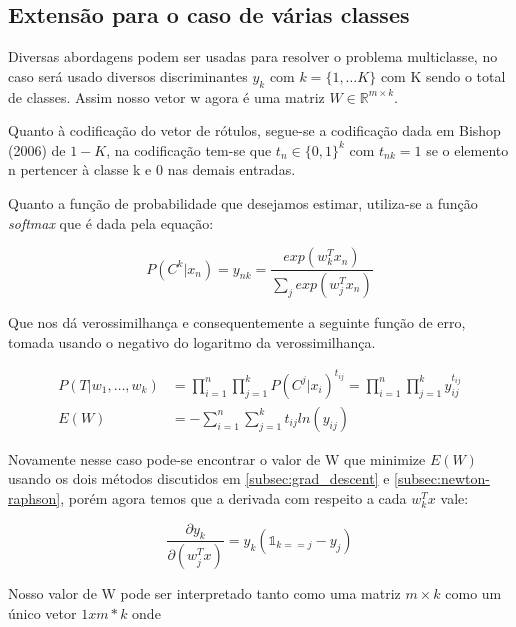 \subsection{Extensão para o caso de várias classes}

Diversas abordagens podem ser usadas para resolver o problema multiclasse, no
caso será usado diversos discriminantes $y_k$ com $k = \{1, \ldots K\}$ com K
sendo o total de classes. Assim nosso vetor w agora é uma matriz
$W \in \mathbb{R}^{m \times k}$. 

Quanto à codificação do vetor de rótulos, 
segue-se a codificação dada em Bishop (2006)\cite{Bishop2006} de $1-K$,
na codificação tem-se que $t_n \in \{0, 1\}^k$ com $t_{nk} = 1$ se o elemento
n pertencer à classe k e 0 nas demais entradas. 

Quanto a função de probabilidade que desejamos estimar, utiliza-se a função
\textit{softmax} que é dada pela equação:

\begin{center}
	\begin{equation}
		P(C^k | x_n) = y_{nk} = \frac{exp(w_k^Tx_n)}{\sum_j exp(w_j^Tx_n)} 
	\end{equation}
\end{center}

Que nos dá verossimilhança e consequentemente a seguinte função de erro, tomada
usando o negativo do logaritmo da verossimilhança.

\begin{center}
	\begin{align*}
				P(T | w_1, \ldots, w_k) &= \prod_{i = 1}^{n} \prod_{j = 1}^{k} P(C^j | x_i)^{t_{ij}} = \prod_{i = 1}^{n} \prod_{j = 1}^{k} y_{ij}^{t_{ij}} \\
		E(W) &= - \sum_{i = 1}^{n} \sum_{j = 1}^{k} t_{ij} ln(y_{ij})	
	\end{align*}
\end{center}

Novamente nesse caso pode-se encontrar o valor de W que minimize $E(W)$ usando os
dois métodos discutidos em \ref{subsec:grad_descent} e \ref{subsec:newton-raphson},
porém agora temos que a derivada com respeito a cada $w_k^Tx$ vale:

\begin{center}
	\begin{equation}\label{eq:softmax_derivative}
		\frac{\partial y_k}{\partial (w_j^Tx)} = y_k(\mathbb{1}_{k == j} - y_j)
	\end{equation}
\end{center}

Nosso valor de W pode ser interpretado tanto como uma matriz $m \times k$ como um
único vetor $1 x m*k$ onde 